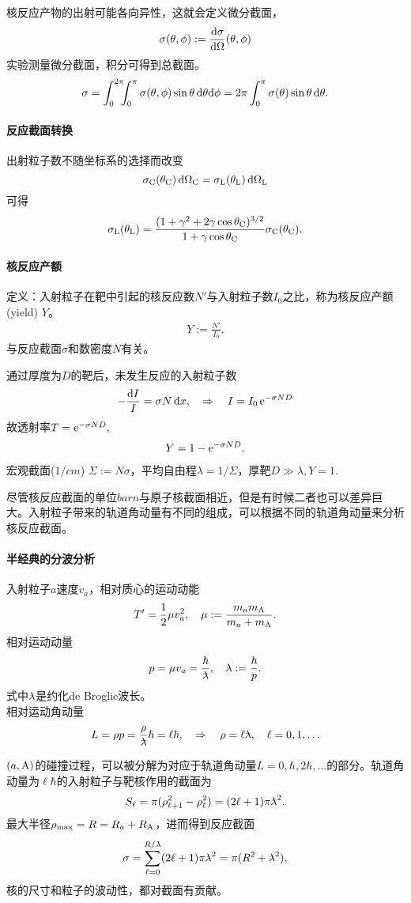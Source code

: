 核反应产物的出射可能各向异性，这就会定义微分截面，
\begin{align}
	\sigma(\theta,\phi):=\dv\sigma\Omega(\theta,\phi)
\end{align}
实验测量微分截面，积分可得到总截面。
\[
	\sigma=\int_0^{2\pi}\bs5\int_0^\pi\sigma(\theta,\phi)\sin\theta\d\theta\nd\phi=2\pi\int_0^\pi\sigma(\theta)\sin\theta\d\theta.
\]
\paragraph{反应截面转换}出射粒子数不随坐标系的选择而改变
\[
	\sigma\CM(\theta\CM)\d\Omega\CM=\sigma\LAB(\theta\LAB)\d\Omega\LAB
\]
可得
\[
	\sigma\LAB(\theta\LAB)=\frac{(1+\gamma^2+2\gamma\cos\theta\CM)^{3/2}}{1+\gamma\cos\theta\CM}\sigma\CM(\theta\CM).
\]
\paragraph{核反应产额}定义：入射粒子在靶中引起的核反应数$N'$与入射粒子数$I_0$之比，称为核反应产额(yield) $Y$。
\begin{align}
	Y:=\frac{N'}{I_0}.
\end{align}
与反应截面$\sigma$和数密度$N$有关。

通过厚度为$D$的靶后，未发生反应的入射粒子数
\[
	-\frac{\d I}{I}=\sigma N\d x,\thus I=I_0\e{-\sigma ND}
\]
故透射率$T=\e{-\sigma ND},$
\begin{align}
	Y=1-\e{-\sigma ND}.
\end{align}
宏观截面($\si{1/cm}$) $\Sigma:=N\sigma$，平均自由程$\lambda=1/\Sigma$，厚靶$D\gg\lambda,Y=1.$

尽管核反应截面的单位$\si{barn}$与原子核截面相近，但是有时候二者也可以差异巨大。入射粒子带来的轨道角动量有不同的组成，可以根据不同的轨道角动量来分析核反应截面。

\paragraph{半经典的分波分析}入射粒子$a$速度$v_a$，相对质心的运动动能
\[
	T'=\frac12\mu v_a^2,\quad \mu:=\frac{m_am_{\nuc A}}{m_a+m_{\nuc A}}.
\]
相对运动动量
\[
	p=\mu v_a=\frac\hbar\barlambda,\quad\lambdabar:=\frac\hbar{p}.
\]
式中$\lambdabar$是约化de Broglie波长。\\
相对运动角动量
\[
	L=\rho p=\frac\rho\barlambda\hbar=\ell\hbar,\thus\rho=\ell\lambdabar,\quad\ell=0,1,\ldots
\]%

$(a,\nuc A)$的碰撞过程，可以被分解为对应于轨道角动量$L=0,\hbar,2\hbar,\ldots$的部分。轨道角动量为$\ell\hbar$的入射粒子与靶核作用的截面为
\[
	S_\ell=\pi(\rho_{\ell+1}^2-\rho_\ell^2)=(2\ell+1)\pi\lambdabar^2.
\]
最大半径$\rho\maxi=R=R_a+R_{\nuc A}$，进而得到反应截面
\begin{align}
	\sigma=\sum_{\ell=0}^{R/\barlambda}(2\ell+1)\pi\lambdabar^2=\pi(R^2+\lambdabar^2),
\end{align}
核的尺寸和粒子的波动性，都对截面有贡献。
